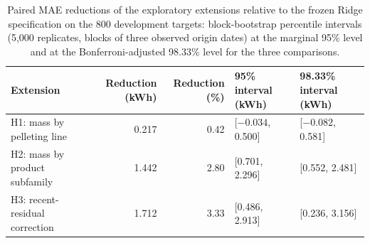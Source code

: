\begin{table}[!htbp]\centering\small\setlength{\tabcolsep}{4pt}
\caption{Paired MAE reductions of the exploratory extensions relative to the frozen Ridge specification on the 800 development targets: block-bootstrap percentile intervals (5,000 replicates, blocks of three observed origin dates) at the marginal 95\% level and at the Bonferroni-adjusted 98.33\% level for the three comparisons.}\label{tab:s_contrasts}
\begin{tabular}{@{}lrrll@{}}\toprule
Extension & Reduction (kWh) & Reduction (\%) & 95\% interval (kWh) & 98.33\% interval (kWh) \\\midrule
H1: mass by pelleting line & 0.217 & 0.42 & [$-0.034$, 0.500] & [$-0.082$, 0.581] \\
H2: mass by product subfamily & 1.442 & 2.80 & [0.701, 2.296] & [0.552, 2.481] \\
H3: recent-residual correction & 1.712 & 3.33 & [0.486, 2.913] & [0.236, 3.156] \\
\bottomrule
\end{tabular}
\end{table}
